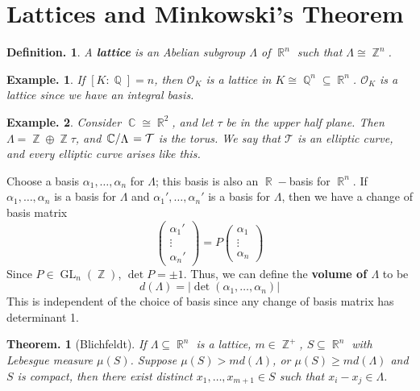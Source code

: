 \documentclass[11pt, a4paper]{memoir}
\DeclareMathOperator{\Q}{{\mathbb{Q}}}
\DeclareMathOperator{\Z}{{\mathbb{Z}}}
\DeclareMathOperator{\R}{{\mathbb{R}}}
\DeclareMathOperator{\C}{{\mathbb{C}}}
\theoremstyle{change}
\newtheorem{theorem}{Theorem.}[section]
\theoremstyle{plain}
\theoremstyle{nonumberplain}
\newtheorem{definition}{Definition.}
\newtheorem{example}{Example.}
\DeclareMathOperator{\GL}{GL}
\newcommand{\quot}[2]{\mathchoice{\left.\raisebox{0.13em}{$#1$}\middle/\raisebox{-0.13em}{$#2$}\right.}
                                 {\left.\raisebox{0.07em}{$#1$}\middle/\raisebox{-0.07em}{$#2$}\right.}
                                 {\left.\raisebox{0.03em}{$#1$}\middle/\raisebox{-0.03em}{$#2$}\right.}
                                 {\left.\raisebox{0em}{$#1$}\middle/\raisebox{0em}{$#2$}\right.}}
\newcommand{\mbf}[1]{{\boldmath\bfseries #1}}
\numberwithin{equation}{section}
\begin{document}
\section{Lattices and Minkowski's Theorem}
\begin{definition}
    A \mbf{lattice} is an Abelian subgroup $\Lambda$ of $\R^n$ such that $\Lambda\cong\Z^n$.
\end{definition}
\begin{example}
    If $[K:\Q]=n$, then $\mathcal{O}_K$ is a lattice in $K\cong\Q^n\subseteq\R^n$.
    $\mathcal{O}_K$ is a lattice since we have an integral basis.
\end{example}
\begin{example}
    Consider $\C\cong\R^2$, and let $\tau$ be in the upper half plane.
    Then $\Lambda=\Z\oplus\Z\tau$, and $\quot{\C}{\Lambda}=\mathcal{T}$ is the torus.
    We say that $\mathcal{T}$ is an elliptic curve, and every elliptic curve arises like this.
\end{example}
Choose a basis $\alpha_1,\ldots,\alpha_n$ for $\Lambda$; this basis is also an $\R-$basis for $\R^n$.
If $\alpha_1,\ldots,\alpha_n$ is a basis for $\Lambda$ and $\alpha_1',\ldots,\alpha_n'$ is a basis for $\Lambda$, then we have a change of basis matrix
\begin{equation*}
    \begin{pmatrix}\alpha_1'\\\vdots\\\alpha_n'\end{pmatrix}=P\begin{pmatrix}\alpha_1\\\vdots\\\alpha_n\end{pmatrix}
\end{equation*}
Since $P\in\GL_n(\Z)$, $\det P=\pm 1$.
Thus, we can define the \mbf{volume of $\Lambda$} to be
\begin{equation*}
    d(\Lambda)=|\det(\alpha_1,\ldots,\alpha_n)|
\end{equation*}
This is independent of the choice of basis since any change of basis matrix has determinant 1.
\begin{theorem}[Blichfeldt]
    If $\Lambda\subseteq\R^n$ is a lattice, $m\in\Z^+$, $S\subseteq\R^n$ with Lebesgue measure $\mu(S)$.
    Suppose $\mu(S)>md(\Lambda)$, or $\mu(S)\geq md(\Lambda)$ and $S$ is compact, then there exist distinct $x_1,\ldots,x_{m+1}\in S$ such that $x_i-x_j\in\Lambda$.
\end{theorem}
\end{document}
